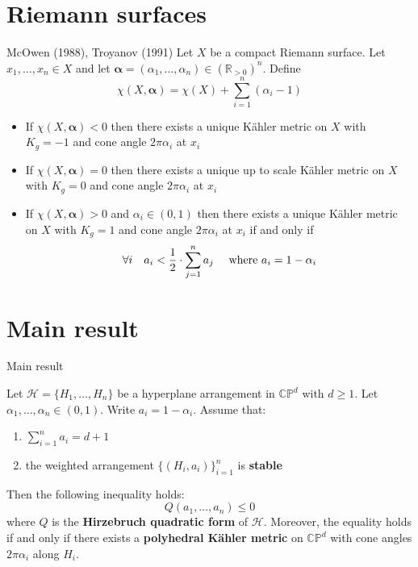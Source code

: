 \documentclass{beamer}
\newcommand{\R}{\mathbb{R}}
\newcommand{\CP}{\mathbb{CP}}
\newcommand{\mH}{\mathcal{H}}
\begin{document}
\section{Riemann surfaces}

\begin{frame}{McOwen (1988), Troyanov (1991)}
	Let \(X\) be a compact Riemann surface. Let \(x_1, \ldots, x_n \in X\) and let \(\bm{\alpha} = (\alpha_1, \ldots, \alpha_n) \in (\R_{>0})^n\). Define
	\[
	\chi(X, \bm{\alpha}) = \chi(X) + \sum_{i=1}^{n} (\alpha_i - 1)
	\]
	\begin{itemize}
		\item If \(\chi(X, \bm{\alpha}) < 0\) then there exists a unique  K\"ahler metric on \(X\) with \(K_g = -1\) and cone angle \(2\pi\alpha_i\) at \(x_i\)
		\item If \(\chi(X, \bm{\alpha}) =0\) then there exists a unique up to scale  K\"ahler metric on \(X\) with \(K_g = 0\) and cone angle \(2\pi\alpha_i\) at \(x_i\)
		\item If \(\chi(X, \bm{\alpha}) > 0\) and \(\alpha_i \in (0,1)\) then there exists a unique  K\"ahler metric on \(X\) with \(K_g = 1\) and cone angle \(2\pi\alpha_i\) at \(x_i\) if and only if
		\[
		\forall i \quad
		a_i < \frac{1}{2} \cdot \sum_{j=1}^{n} a_j  \quad \textup{ where } a_i = 1-\alpha_i
		\]
	\end{itemize}
\end{frame}


\section{Main result}
\begin{frame}{Main result}
	\begin{theorem}[dB-Panov, 2025-26]
		Let \(\mH = \{H_1, \ldots, H_n\}\) be a hyperplane arrangement in \(\CP^d\) with \(d \geq 1\). Let \(\alpha_1, \ldots, \alpha_n \in (0,1)\). Write \(a_i = 1-\alpha_i\). Assume that:
		\begin{enumerate}
			\item\label{it:cy} \(\sum_{i=1}^{n} a_i = d+1\)
			\item the weighted arrangement \(\{(H_i,a_i)\}_{i=1}^n\) is \textbf{stable}
		\end{enumerate}
		Then the following inequality holds:
		\begin{equation}\label{eq:my}
		Q(a_1, \ldots, a_n) \leq 0 	
		\end{equation}
		where \(Q\) is the \textbf{Hirzebruch quadratic form} of \(\mH\). 
		Moreover, the equality holds if and only if there exists a \textbf{polyhedral K\"ahler metric} on \(\CP^d\) with cone angles \(2\pi\alpha_i\) along \(H_i\).
	\end{theorem}
\end{frame}
\end{document}
